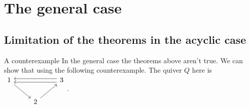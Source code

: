 \documentclass{beamer}
\newcommand{\lefttwicedoublearrow}{\arrow[ll, shift right=0.6ex]\arrow[ll, shift left=0.6ex]}
\begin{document}
\section{The general case}
\subsection{Limitation of the theorems in the acyclic case}
\begin{frame}[fragile]{A counterexample}
\indent In the general case the theorems above aren't true. We can show that using the following counterexample. The quiver $Q$ here is $\begin{tikzcd}
1\arrow[rd] &  & 3\lefttwicedoublearrow\\
 & 2\arrow[ur]
\end{tikzcd}$.
\end{frame}
\end{document}
